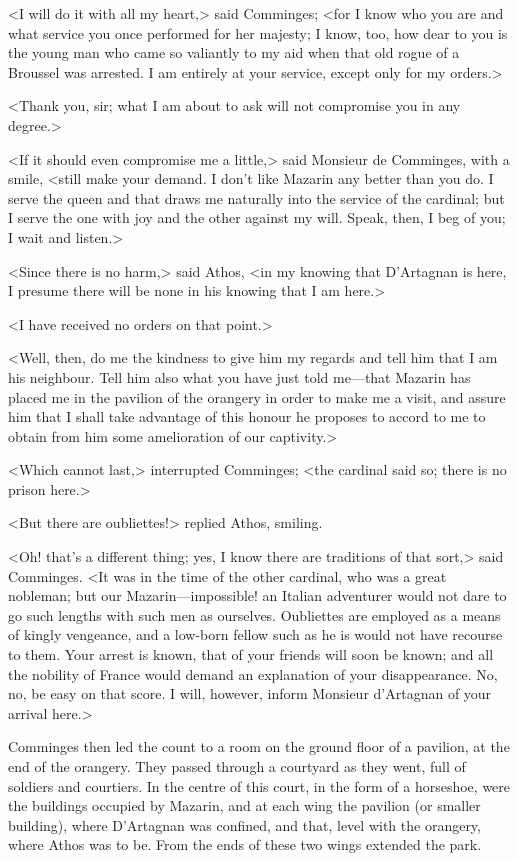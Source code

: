 <I will do it with all my heart,> said Comminges; <for I know who you are and what service you once performed for her majesty; I know, too, how dear to you is the young man who came so valiantly to my aid when that old rogue of a Broussel was arrested. I am entirely at your service, except only for my orders.>

<Thank you, sir; what I am about to ask will not compromise you in any degree.>

<If it should even compromise me a little,> said Monsieur de Comminges, with a smile, <still make your demand. I don't like Mazarin any better than you do. I serve the queen and that draws me naturally into the service of the cardinal; but I serve the one with joy and the other against my will. Speak, then, I beg of you; I wait and listen.>

<Since there is no harm,> said Athos, <in my knowing that D'Artagnan is here, I presume there will be none in his knowing that I am here.>

<I have received no orders on that point.>

<Well, then, do me the kindness to give him my regards and tell him that I am his neighbour. Tell him also what you have just told me—that Mazarin has placed me in the pavilion of the orangery in order to make me a visit, and assure him that I shall take advantage of this honour he proposes to accord to me to obtain from him some amelioration of our captivity.>

<Which cannot last,> interrupted Comminges; <the cardinal said so; there is no prison here.>

<But there are oubliettes!> replied Athos, smiling.

<Oh! that's a different thing; yes, I know there are traditions of that sort,> said Comminges. <It was in the time of the other cardinal, who was a great nobleman; but our Mazarin—impossible! an Italian adventurer would not dare to go such lengths with such men as ourselves. Oubliettes are employed as a means of kingly vengeance, and a low-born fellow such as he is would not have recourse to them. Your arrest is known, that of your friends will soon be known; and all the nobility of France would demand an explanation of your disappearance. No, no, be easy on that score. I will, however, inform Monsieur d'Artagnan of your arrival here.>

Comminges then led the count to a room on the ground floor of a pavilion, at the end of the orangery. They passed through a courtyard as they went, full of soldiers and courtiers. In the centre of this court, in the form of a horseshoe, were the buildings occupied by Mazarin, and at each wing the pavilion (or smaller building), where D'Artagnan was confined, and that, level with the orangery, where Athos was to be. From the ends of these two wings extended the park.

